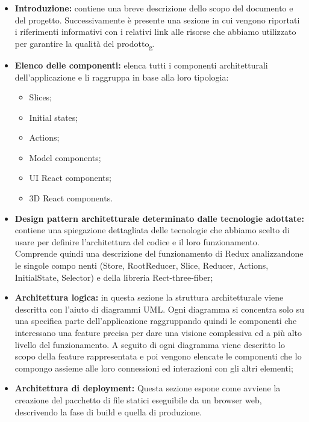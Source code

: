 \begin{itemize}
\item \textbf{Introduzione:} contiene una breve descrizione dello scopo del documento e del progetto.
Successivamente è presente una sezione in cui vengono riportati i riferimenti informativi 
con i relativi link alle risorse che abbiamo utilizzato per garantire la qualità del prodotto\textsubscript{g}.

\item \textbf{Elenco delle componenti:} elenca tutti i componenti architetturali dell'applicazione e li raggruppa in base alla loro tipologia:
\begin{itemize}
 	\item Slices;
 	\item  Initial states;
 	\item Actions; 
 	\item Model components; 
 	\item UI React components; 
 	\item 3D React components.
\end{itemize}

\item \textbf{Design pattern architetturale determinato dalle tecnologie adottate:} contiene una spiegazione dettagliata delle tecnologie che abbiamo scelto di usare per definire l'architettura del codice e il loro funzionamento.
Comprende quindi una descrizione del funzionamento di Redux analizzandone le singole compo	nenti (Store, RootReducer, Slice, Reducer, Actions, InitialState, Selector) e della libreria Rect-three-fiber;

\item \textbf{ Architettura logica:} in questa sezione la struttura architetturale viene descritta con l'aiuto di diagrammi UML. Ogni diagramma si concentra solo su una specifica parte dell'applicazione raggruppando quindi le componenti che interessano una feature precisa per dare una visione complessiva ed a più alto livello del funzionamento.
A seguito di ogni diagramma viene descritto lo scopo della feature rappresentata e poi vengono elencate le componenti che lo compongo assieme alle loro connessioni ed interazioni con gli altri elementi;

\item \textbf{Architettura di deployment:} Questa sezione espone come avviene la creazione del pacchetto di file statici eseguibile da un browser web, descrivendo la fase di build e quella di produzione.

\end{itemize}